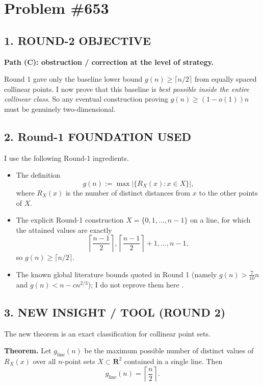 \section{Problem \#653}

\subsection*{1. ROUND-2 OBJECTIVE}

\textbf{Path (C): obstruction / correction at the level of strategy.}

Round 1 gave only the baseline lower bound $g(n)\ge \lceil n/2\rceil$ from equally spaced collinear points.  I now prove that this baseline is \emph{best possible inside the entire collinear class}.  So any eventual construction proving $g(n)\ge (1-o(1))n$ must be genuinely two-dimensional.

\subsection*{2. Round-1 FOUNDATION USED}

I use the following Round-1 ingredients.

\begin{itemize}
\item The definition
\[
g(n):=\max\bigl|\{R_X(x):x\in X\}\bigr|,
\]
where $R_X(x)$ is the number of distinct distances from $x$ to the other points of $X$.
\item The explicit Round-1 construction $X=\{0,1,\dots,n-1\}$ on a line, for which the attained values are exactly
\[
\left\lceil\frac{n-1}{2}\right\rceil,\left\lceil\frac{n-1}{2}\right\rceil+1,\dots,n-1,
\]
so $g(n)\ge \lceil n/2\rceil$.
\item The known global literature bounds quoted in Round 1 (namely $g(n)>\tfrac{7}{10}n$ and $g(n)<n-cn^{2/3}$); I do not reprove them here \cite{EP653}.
\end{itemize}

\subsection*{3. NEW INSIGHT / TOOL (ROUND 2)}

The new theorem is an exact classification for collinear point sets.

\medskip
\noindent
\textbf{Theorem.}
Let $g_{\mathrm{line}}(n)$ be the maximum possible number of distinct values of $R_X(x)$ over all $n$-point sets $X\subset \mathbf{R}^2$ contained in a single line.  Then
\[
g_{\mathrm{line}}(n)=\left\lceil\frac{n}{2}\right\rceil.
\]


